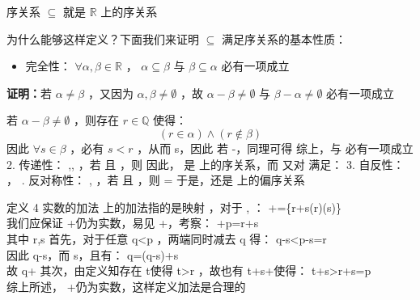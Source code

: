 \begin{definition}{序关系}
$\subseteq$ 就是 $\mathbb{R}$ 上的序关系
\end{definition}
为什么能够这样定义？下面我们来证明 $\subseteq$  满足序关系的基本性质：

\begin{itemize}
\item 完全性： $\forall \alpha,\beta \in\mathbb{R}$ ， $\alpha\subseteq \beta$  与 $\beta\subseteq \alpha$  必有一项成立
\end{itemize}

\textbf{证明：}若 $\alpha\neq\beta$ ，又因为 $\alpha,\beta\neq\emptyset$ ，故 $\alpha-\beta\neq \emptyset$ 与 $\beta-\alpha \neq \emptyset$ 必有一项成立

若 $\alpha-\beta\neq\emptyset$ ，则存在 $r\in\mathbb{Q}$ 使得：
$$(r\in\alpha)\wedge (r\notin\beta)$$ 
因此 $\forall s\in\beta$ ，必有 $s<r$ ，从而 s\in\alpha ，因此 \beta\subset \alpha 
若 \beta-\alpha\neq\emptyset ，同理可得 \alpha\subset \beta 
综上，\alpha\subseteq \beta   与 \beta\subseteq \alpha  必有一项成立
2. 传递性： \forall \alpha,\beta,\gamma \in {} ，若 \alpha\subseteq\beta 且 \beta\subseteq\gamma ，则 \alpha\subseteq\gamma 
因此， \subseteq 是  上的序关系，而 \subseteq 又对  满足：
3. 自反性： \forall \alpha\in{} ， \alpha\subseteq{}. 反对称性： \forall \alpha,\beta\in{} ，若 \alpha\subseteq\beta 且 \beta\subseteq\alpha ，则 \alpha=\beta 
于是，\subseteq 还是  上的偏序关系


定义 4  实数的加法
 上的加法指的是映射 \times{}\to{} ，对于 \alpha,\beta\in{} ：
 \alpha+\beta=\{r+s\mid(r\in\alpha)\wedge(s\in\beta)\}\\ 
我们应保证 \alpha+\beta 仍为实数，易见 \alpha+\beta\neq \emptyset ，考察：
\alpha+\beta\ni p=r+s\\ 
其中 r\in\alpha,s\in\beta 
首先，对于任意 \ni q<p ，两端同时减去 q 得：
q-s<p-s=r \\ 
因此 q-s\in\alpha，而 s\in\beta ，且有：
q=(q-s)+s\\ 
故 q\in\alpha+\beta 
其次，由定义知存在 t\in\alpha 使得 t>r ，故也有 t+s\in\alpha+\beta 使得：
t+s>r+s=p\\ 
综上所述， \alpha+\beta 仍为实数，这样定义加法是合理的

